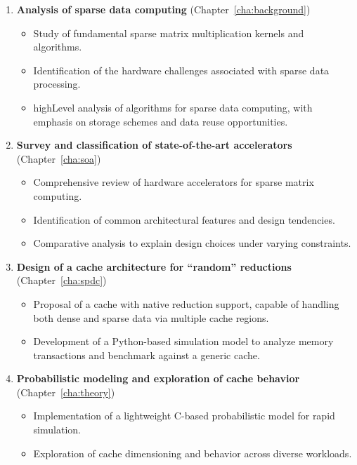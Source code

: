 \begin{enumerate}
    \item \textbf{Analysis of sparse data computing} {\raggedleft \hfill (Chapter~\ref{cha:background})}
    \begin{itemize}
        \item Study of fundamental sparse matrix multiplication kernels and algorithms.
        \item Identification of the hardware challenges associated with sparse data processing.
        \item \Gls{highLevel} analysis of algorithms for sparse data computing, with emphasis on storage schemes and data reuse opportunities.
    \end{itemize}

    \item \textbf{Survey and classification of state-of-the-art accelerators} {\raggedleft \hfill (Chapter~\ref{cha:soa})}
    \begin{itemize}
        \item Comprehensive review of hardware accelerators for sparse matrix computing.
        \item Identification of common architectural features and design tendencies.
        \item Comparative analysis to explain design choices under varying constraints.
    \end{itemize}

    \item \textbf{Design of a cache architecture for ``random'' \glspl{reduction}} {\raggedleft \hfill (Chapter~\ref{cha:spdc})}
    \begin{itemize}
        \item Proposal of a cache with native \gls{reduction} support, capable of handling both dense and sparse data via multiple cache regions.
        \item Development of a Python-based simulation model to analyze memory transactions and benchmark against a generic cache.
    \end{itemize}

    \item \textbf{Probabilistic modeling and exploration of cache behavior} {\raggedleft \hfill (Chapter~\ref{cha:theory})}
    \begin{itemize}
        \item Implementation of a lightweight C-based probabilistic model for rapid simulation.
        \item Exploration of cache dimensioning and behavior across diverse workloads.
    \end{itemize}


\end{enumerate}
